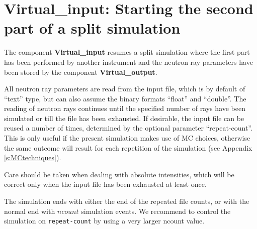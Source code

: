 \section{Virtual\_input: Starting the second part of a split simulation}
\label{virtual_input}


The component {\bf Virtual\_input} resumes a split simulation where the
first part has been performed by another instrument and the neutron ray
parameters have been stored by the component {\bf Virtual\_output}.

All neutron ray parameters are read from the input file, which is by default
of ``text'' type, but can also assume the binary formats
``float'' and ``double''. The reading of neutron rays continues until the
specified number of rays have been simulated or
till the file has been exhausted. If desirable, the input file
can be reused a number of times, determined by the optional parameter
``repeat-count''. This is only useful if the present simulation makes use of
MC choices, otherwise the same outcome will result for each repetition of the
simulation (see Appendix \ref{s:MCtechniques}).

Care should be taken when dealing with
absolute intensities, which will be correct only
when the input file has been exhausted at least once.

The simulation ends with either the end of the repeated file counts,
or with the normal end with $ncount$ \MCS simulation events. We recommend to
control the simulation on \verb+repeat-count+ by using
a very larger ncount value.
